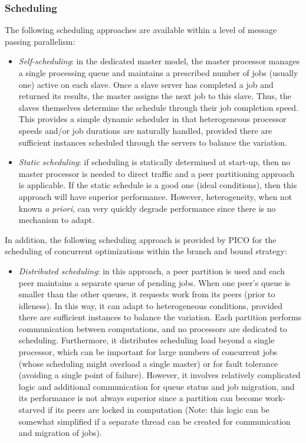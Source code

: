 \subsubsection{Scheduling}\label{parallel:SLP:message:sched}

The following scheduling approaches are available within a level of
message passing parallelism:

\begin{itemize}
\item \emph{Self-scheduling}: in the dedicated master model, the master
  processor manages a single processing queue and maintains a
  prescribed number of jobs (usually one) active on each slave. Once a
  slave server has completed a job and returned its results, the
  master assigns the next job to this slave. Thus, the slaves
  themselves determine the schedule through their job completion
  speed. This provides a simple dynamic scheduler in that
  heterogeneous processor speeds and/or job durations are naturally
  handled, provided there are sufficient instances scheduled through
  the servers to balance the variation.

\item \emph{Static scheduling}: if scheduling is statically determined
  at start-up, then no master processor is needed to direct traffic
  and a peer partitioning approach is applicable. If the static
  schedule is a good one (ideal conditions), then this approach will
  have superior performance. However, heterogeneity, when not known
  \emph{a priori}, can very quickly degrade performance since there is
  no mechanism to adapt.
\end{itemize}

In addition, the following scheduling approach is provided by PICO for
the scheduling of concurrent optimizations within the branch and bound
strategy:

\begin{itemize}
\item \emph{Distributed scheduling}: in this approach, a peer
  partition is used and each peer maintains a separate queue of
  pending jobs. When one peer's queue is smaller than the other
  queues, it requests work from its peers (prior to idleness). In this
  way, it can adapt to heterogeneous conditions, provided there are
  sufficient instances to balance the variation. Each partition
  performs communication between computations, and no processors are
  dedicated to scheduling. Furthermore, it distributes scheduling load
  beyond a single processor, which can be important for large numbers
  of concurrent jobs (whose scheduling might overload a single master)
  or for fault tolerance (avoiding a single point of failure).
  However, it involves relatively complicated logic and additional
  communication for queue status and job migration, and its
  performance is not always superior since a partition can become
  work-starved if its peers are locked in computation (Note: this
  logic can be somewhat simplified if a separate thread can be created
  for communication and migration of jobs).
\end{itemize}

